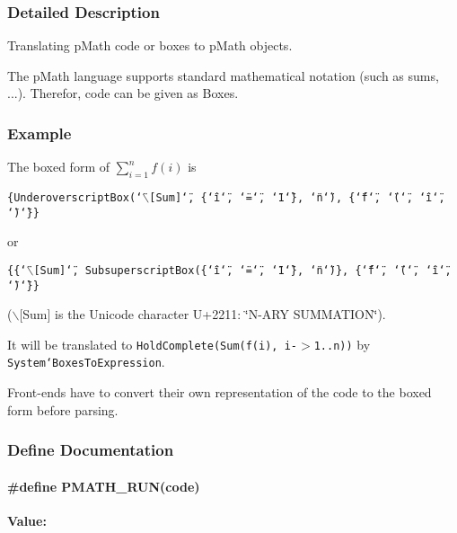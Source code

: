 \subsubsection{Detailed Description}
Translating pMath code or boxes to pMath objects. 

The pMath language supports standard mathematical notation (such as sums, ...). Therefor, code can be given as Boxes.\hypertarget{group__parser_Example}{}\subsubsection{Example}\label{group__parser_Example}
The boxed form of $ \sum_{i=1}^n f(i) $ is \par
 {\tt \{UnderoverscriptBox(\char`\"{}$\backslash$\mbox{[}Sum\mbox{]}\char`\"{}, \{\char`\"{}i\char`\"{}, \char`\"{}=\char`\"{}, \char`\"{}1\char`\"{}\}, \char`\"{}n\char`\"{}), \{\char`\"{}f\char`\"{}, \char`\"{}(\char`\"{}, \char`\"{}i\char`\"{}, \char`\"{})\char`\"{}\}\}} \par
 or \par
 {\tt \{\{\char`\"{}$\backslash$\mbox{[}Sum\mbox{]}\char`\"{}, SubsuperscriptBox(\{\char`\"{}i\char`\"{}, \char`\"{}=\char`\"{}, \char`\"{}1\char`\"{}\}, \char`\"{}n\char`\"{})\}, \{\char`\"{}f\char`\"{}, \char`\"{}(\char`\"{}, \char`\"{}i\char`\"{}, \char`\"{})\char`\"{}\}\}} \par
 ($\backslash$\mbox{[}Sum\mbox{]} is the Unicode character U+2211: \char`\"{}N-ARY SUMMATION\char`\"{}).

It will be translated to {\tt HoldComplete(Sum(f(i), i-$>$1..n))} by {\tt System`BoxesToExpression}.

Front-ends have to convert their own representation of the code to the boxed form before parsing. 

\subsubsection{Define Documentation}
\hypertarget{group__parser_gf8ba5467c4b9e3e32ad0a8606466cb83}{
\paragraph[{PMATH\_\-RUN}]{\setlength{\rightskip}{0pt plus 5cm}\#define PMATH\_\-RUN(code)}\hfill}
\label{group__parser_gf8ba5467c4b9e3e32ad0a8606466cb83}


\textbf{Value:}

